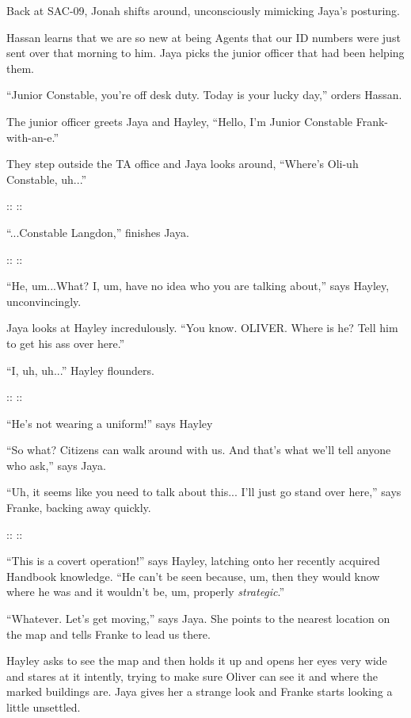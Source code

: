 Back at SAC-09, Jonah shifts around, unconsciously mimicking Jaya's posturing.



Hassan learns that we are so new at being Agents that our ID numbers were just sent over that morning to him.  Jaya picks the junior officer that had been helping them.

``Junior Constable, you're off desk duty.  Today is your lucky day,'' orders Hassan.

The junior officer greets Jaya and Hayley, ``Hello, I'm Junior Constable Frank-with-an-e.''



They step outside the TA office and Jaya looks around, ``Where's Oli-uh Constable, uh...''

::  ::

``...Constable Langdon,'' finishes Jaya.

::  ::

``He, um...What?  I, um, have no idea who you are talking about,'' says Hayley, unconvincingly.

Jaya looks at Hayley incredulously.  ``You know.  OLIVER.  Where is he?  Tell him to get his ass over here.''

``I, uh, uh...'' Hayley flounders.

::  ::

``He's not wearing a uniform!'' says Hayley

``So what?  Citizens can walk around with us.  And that's what we'll tell anyone who ask,'' says Jaya.

``Uh, it seems like you need to talk about this... I'll just go stand over here,'' says Franke, backing away quickly.

::  ::

``This is a covert operation!'' says Hayley, latching onto her recently acquired Handbook knowledge.  ``He can't be seen because, um, then they would know where he was and it wouldn't be, um, properly \textit{strategic}.''

``Whatever.  Let's get moving,'' says Jaya.  She points to the nearest location on the map and tells Franke to lead us there.



Hayley asks to see the map and then holds it up and opens her eyes very wide and stares at it intently, trying to make sure Oliver can see it and where the marked buildings are.  Jaya gives her a strange look and Franke starts looking a little unsettled.

